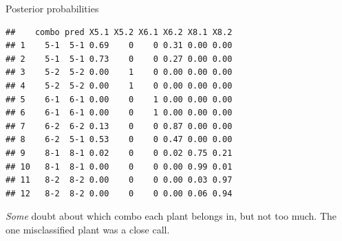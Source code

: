 \begin{frame}[fragile]{Posterior probabilities}

  {\small
\begin{knitrout}
\color{fgcolor}\begin{kframe}
\begin{alltt}
\hlkwb{=}\hlopt{$}\hlstd{)}
\hlopt{$}
\end{alltt}
\begin{verbatim}
##    combo pred X5.1 X5.2 X6.1 X6.2 X8.1 X8.2
## 1    5-1  5-1 0.69    0    0 0.31 0.00 0.00
## 2    5-1  5-1 0.73    0    0 0.27 0.00 0.00
## 3    5-2  5-2 0.00    1    0 0.00 0.00 0.00
## 4    5-2  5-2 0.00    1    0 0.00 0.00 0.00
## 5    6-1  6-1 0.00    0    1 0.00 0.00 0.00
## 6    6-1  6-1 0.00    0    1 0.00 0.00 0.00
## 7    6-2  6-2 0.13    0    0 0.87 0.00 0.00
## 8    6-2  5-1 0.53    0    0 0.47 0.00 0.00
## 9    8-1  8-1 0.02    0    0 0.02 0.75 0.21
## 10   8-1  8-1 0.00    0    0 0.00 0.99 0.01
## 11   8-2  8-2 0.00    0    0 0.00 0.03 0.97
## 12   8-2  8-2 0.00    0    0 0.00 0.06 0.94
\end{verbatim}
\end{kframe}
\end{knitrout}
}

\emph{Some} doubt about which combo each plant belongs in, but not too
much. The one misclassified plant was a close call.

\end{frame}

